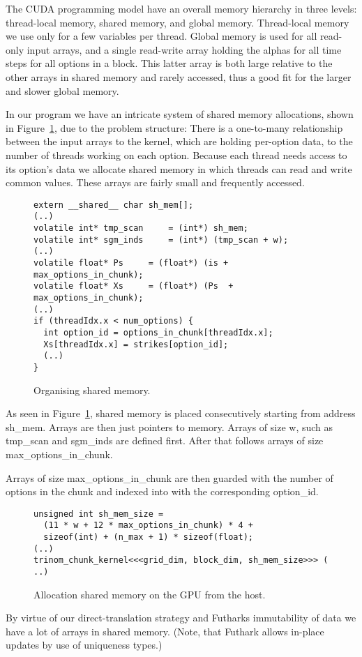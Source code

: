 The CUDA programming model have an overall memory hierarchy
in three levels: thread-local memory, shared memory, and
global memory. Thread-local memory we use only for a few
variables per thread. Global memory is used for all
read-only input arrays, and a single read-write array
holding the alphas for all time steps for all options in a
block. This latter array is both large relative to the other
arrays in shared memory and rarely accessed, thus a good fit
for the larger and slower global memory.

In our program we have an intricate system of shared memory
allocations, shown in Figure~\ref{fig:shmem}, due to the
problem structure: There is a one-to-many relationship
between the input arrays to the kernel, which are holding
per-option data, to the number of threads working on each
option. Because each thread needs access to its option's data
we allocate shared memory in which threads can read and write
common values. These arrays are fairly small and
frequently accessed.
%
\begin{figure}[bt]
\begin{center}
\begin{lstlisting}
extern __shared__ char sh_mem[];
(..)
volatile int* tmp_scan     = (int*) sh_mem;
volatile int* sgm_inds     = (int*) (tmp_scan + w);
(..)
volatile float* Ps     = (float*) (is + max_options_in_chunk);
volatile float* Xs     = (float*) (Ps  + max_options_in_chunk);
(..)
if (threadIdx.x < num_options) {
  int option_id = options_in_chunk[threadIdx.x];
  Xs[threadIdx.x] = strikes[option_id];
  (..)
}
\end{lstlisting}
\caption{Organising shared memory.}
\label{fig:shmem}
\end{center}
\end{figure}
%

As seen in Figure~\ref{fig:shmem}, shared memory is placed 
consecutively starting from address sh\_mem. Arrays are then just pointers
to memory. Arrays of size w, such as tmp\_scan and sgm\_inds are defined
first. After that follows arrays of size max\_options\_in\_chunk.

Arrays of size max\_options\_in\_chunk are then guarded with the
number of options in the chunk and indexed into with the corresponding
option\_id.

%
\begin{figure}[bt]
\begin{center}
\begin{lstlisting}
unsigned int sh_mem_size =
  (11 * w + 12 * max_options_in_chunk) * 4 +
  sizeof(int) + (n_max + 1) * sizeof(float);
(..)
trinom_chunk_kernel<<<grid_dim, block_dim, sh_mem_size>>> ( ..)
\end{lstlisting}
\end{center}
\caption{Allocation shared memory on the GPU from the host.}
\label{fig:allocshmem}
\end{figure}
%
By virtue of our direct-translation strategy and Futharks
immutability of data we have a lot of arrays in shared
memory. (Note, that Futhark allows in-place updates by use
of uniqueness types.) 

